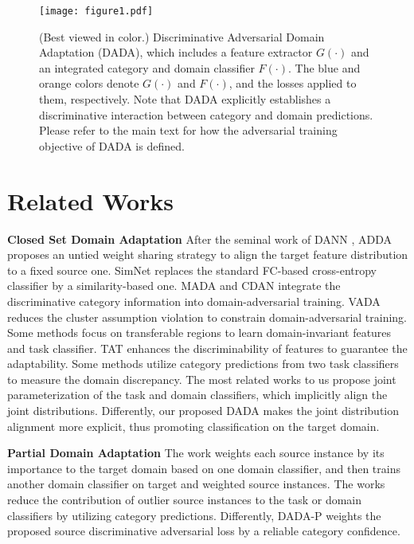 \documentclass[letterpaper]{article} \usepackage{aaai20}  \usepackage{times}  \usepackage{helvet} \usepackage{courier}  \usepackage[hyphens]{url}  \usepackage{graphicx} \urlstyle{rm} \def\UrlFont{\rm}  \usepackage{graphicx}  \frenchspacing  \setlength{\pdfpagewidth}{8.5in}  \setlength{\pdfpageheight}{11in}
\begin{document}
\begin{figure*}[t]
	\centering
	\texttt{[image: figure1.pdf]}
	\caption{(Best viewed in color.) Discriminative Adversarial Domain Adaptation (DADA), which includes a feature extractor $G(\cdot)$ and an integrated category and domain classifier $F(\cdot)$. The blue and orange colors denote $G(\cdot)$ and $F(\cdot)$, and the losses applied to them, respectively. Note that DADA explicitly establishes a discriminative interaction between category and domain predictions. Please refer to the main text for how the adversarial training objective of DADA is defined.
	}
	\label{fig:dada} 
\end{figure*}

\section{Related Works}
\noindent\textbf{Closed Set Domain Adaptation} After the seminal work of DANN \cite{dann}, ADDA \cite{adda} proposes an untied weight sharing strategy to align the target feature distribution to a fixed source one. SimNet \cite{SimNet} replaces the standard FC-based cross-entropy classifier by a similarity-based one. MADA \cite{mada} and CDAN \cite{cdan} integrate the discriminative category information into domain-adversarial training. VADA \cite{dirt_t} reduces the cluster assumption violation to constrain domain-adversarial training. Some methods \cite{tada,hla} focus on transferable regions to learn domain-invariant features and task classifier. TAT \cite{tat} enhances the discriminability of features to guarantee the adaptability. Some methods \cite{mcd,adr,swd} utilize category predictions from two task classifiers to measure the domain discrepancy. The most related works \cite{idda,dann_ca} to us propose joint parameterization of the task and domain classifiers, which implicitly align the joint distributions. Differently, our proposed DADA makes the joint distribution alignment more explicit, thus promoting classification on the target domain.

\noindent\textbf{Partial Domain Adaptation} The work \cite{iwan} weights each source instance by its importance to the target domain based on one domain classifier, and then trains another domain classifier on target and weighted source instances. The works \cite{san,pada} reduce the contribution of outlier source instances to the task or domain classifiers by utilizing category predictions. Differently, DADA-P weights the proposed source discriminative adversarial loss by a reliable category confidence.
\end{document}
